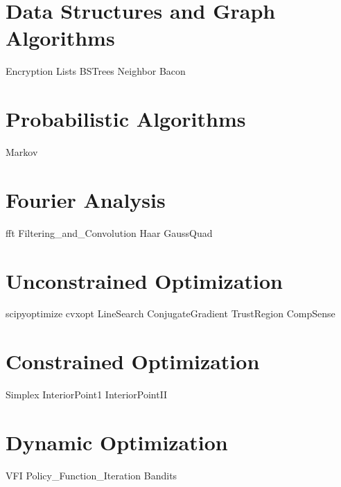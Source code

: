\documentclass[nociteref]{SIAM-GH-book}
\begin{document}
\part{Data Structures and Graph Algorithms}
{Encryption}
{Lists}
{BSTrees}
{Neighbor}
{Bacon}
\part{Probabilistic Algorithms}
{Markov}
\part{Fourier Analysis}
{fft}
{Filtering_and_Convolution}
{Haar}
{GaussQuad}


\part{Unconstrained Optimization}
{scipyoptimize}
{cvxopt}
{LineSearch}
{ConjugateGradient}
{TrustRegion}
{CompSense}
\part{Constrained Optimization}
{Simplex}
{InteriorPoint1}
{InteriorPointII}
\part{Dynamic Optimization}
{VFI}
{Policy_Function_Iteration}
{Bandits}
\end{document}
